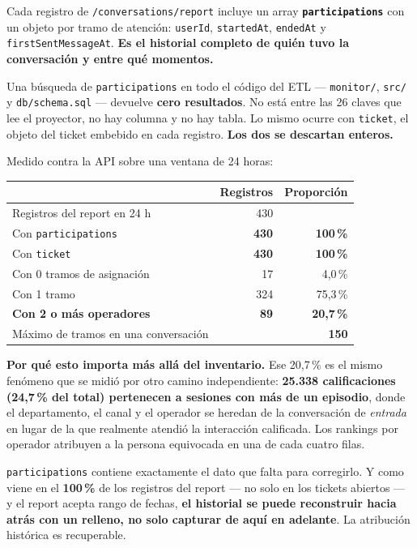 \documentclass[11pt,a4paper]{article}
\newcommand{\cod}[1]{\texttt{\small #1}}
\begin{document}
\begin{alerta}
Cada registro de \cod{/conversations/report} incluye un array
\textbf{\cod{participations}} con un objeto por tramo de atención: \cod{userId},
\cod{startedAt}, \cod{endedAt} y \cod{firstSentMessageAt}. \textbf{Es el historial
completo de quién tuvo la conversación y entre qué momentos.}

\vspace{0.4em}
Una búsqueda de \cod{participations} en todo el código del ETL --- \cod{monitor/},
\cod{src/} y \cod{db/schema.sql} --- devuelve \textbf{cero resultados}. No está entre las
26 claves que lee el proyector, no hay columna y no hay tabla. Lo mismo ocurre con
\cod{ticket}, el objeto del ticket embebido en cada registro. \textbf{Los dos se
descartan enteros.}
\end{alerta}

Medido contra la API sobre una ventana de 24 horas:

\begin{center}
\begin{tabular}{@{}lrr@{}}
\toprule
& \textbf{Registros} & \textbf{Proporción} \\
\midrule
Registros del report en 24 h            & 430 & \\
Con \cod{participations}                & \textbf{430} & \textbf{100\,\%} \\
Con \cod{ticket}                        & \textbf{430} & \textbf{100\,\%} \\
\midrule
Con 0 tramos de asignación              & 17  & 4,0\,\% \\
Con 1 tramo                             & 324 & 75,3\,\% \\
\textbf{Con 2 o más operadores}         & \textbf{89} & \textbf{20,7\,\%} \\
\midrule
Máximo de tramos en una conversación    & \multicolumn{2}{r}{\textbf{150}} \\
\bottomrule
\end{tabular}
\end{center}

\begin{nota}
\textbf{Por qué esto importa más allá del inventario.} Ese 20,7\,\% es el mismo fenómeno
que se midió por otro camino independiente: \textbf{25.338 calificaciones (24,7\,\% del
total) pertenecen a sesiones con más de un episodio}, donde el departamento, el canal y el
operador se heredan de la conversación de \emph{entrada} en lugar de la que realmente
atendió la interacción calificada. Los rankings por operador atribuyen a la persona
equivocada en una de cada cuatro filas.

\vspace{0.4em}
\cod{participations} contiene exactamente el dato que falta para corregirlo. Y como viene
en el \textbf{100\,\%} de los registros del report --- no solo en los tickets abiertos ---
y el report acepta rango de fechas, \textbf{el historial se puede reconstruir hacia atrás
con un relleno, no solo capturar de aquí en adelante}. La atribución histórica es
recuperable.
\end{nota}
\end{document}
